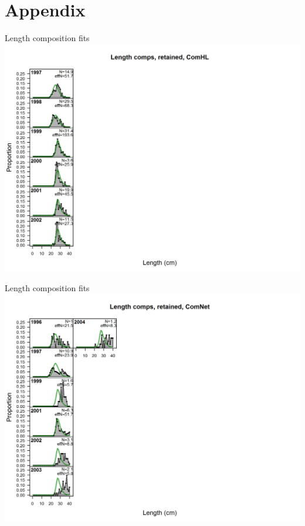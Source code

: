 \documentclass[ignorenonframetext,]{beamer}
\begin{document}
\section{Appendix}\label{appendix}

\begin{frame}{Length composition fits}\includegraphics{./r4ss/plots_mod1/comp_lenfit_flt1mkt2.png}\end{frame}

\begin{frame}{Length composition fits}\includegraphics{./r4ss/plots_mod1/comp_lenfit_flt2mkt2.png}\end{frame}
\end{document}
